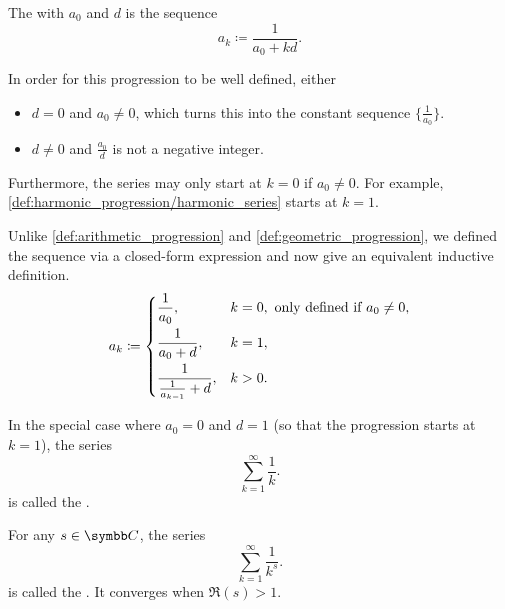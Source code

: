 \begin{definition}\label{def:harmonic_progression}
  The  with  \( a_0 \) and  \( d \) is the sequence
  \begin{equation*}
    a_k \coloneqq \frac 1 {a_0 + kd}.
  \end{equation*}

  \begin{defenum}
     In order for this progression to be well defined, either
    \begin{itemize}
      \item \( d = 0 \) and \( a_0 \neq 0 \), which turns this into the constant sequence \( \{ \tfrac 1 {a_0} \} \).

      \item \( d \neq 0 \) and \( \frac {a_0} d \) is not a negative integer.
    \end{itemize}

    Furthermore, the series may only start at \( k = 0 \) if \( a_0 \neq 0 \). For example, \cref{def:harmonic_progression/harmonic_series} starts at \( k = 1 \).

     Unlike \cref{def:arithmetic_progression} and \cref{def:geometric_progression}, we defined the sequence via a closed-form expression and now give an equivalent inductive definition. \begin{equation*}
      a_k \coloneqq \begin{dcases}
        \frac 1 {a_0}, &k = 0, \text{ only defined if } a_0 \neq 0, \\
        \frac 1 {a_0 + d}, &k = 1, \\
        \frac 1 {\frac 1 {a_{k-1}} + d}, &k > 0.
      \end{dcases}
    \end{equation*}

     In the special case where \( a_0 = 0 \) and \( d = 1 \) (so that the progression starts at \( k = 1 \)), the series
    \begin{equation}\label{def:harmonic_progression/harmonic_series}
      \sum_{k=1}^\infty \frac 1 k.
    \end{equation}
    is called the .

     For any \( s \in \C \), the series
    \begin{equation}\label{def:harmonic_progression/hyperharmonic_series}
      \sum_{k=1}^\infty \frac 1 {k^s}.
    \end{equation}
    is called the . It converges when \( \Re(s) > 1 \).
  \end{defenum}
\end{definition}
